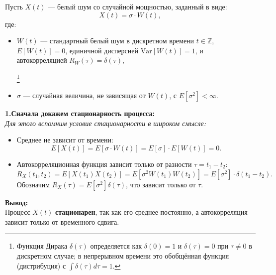 {

Пусть \( X(t) \) — белый шум со случайной мощностью, заданный в виде:
\[
X(t) = \sigma \cdot W(t),
\]
где:
\begin{itemize}
\item \( W(t) \) — стандартный белый шум в дискретном времени \(t
  \in \mathbb{Z}\), \(
  E[W(t)] = 0 \), единичной дисперсией \( \text{Var}[W(t)] = 1 \),
  и автокорреляцией \( R_W(\tau) = \delta(\tau) \),

  \footnote{Функция Дирака $\delta(\tau)$ определяется как
    $\delta(0)=1$ и $\delta(\tau)=0$ при $\tau \neq 0$ в дискретном
    случае; в непрерывном времени это обобщённая функция (дистрибуция)
  с $\int \delta(\tau) d\tau = 1$.}

\item \( \sigma \) — случайная величина, не зависящая от \( W(t)
  \), с \( E[\sigma^2] < \infty \).
\end{itemize}

\textbf{1.Сначала докажем стационарность процесса:}\\
\textit{Для этого вспомним условие стационарности в широком смысле:}

\begin{itemize}
\item Среднее не зависит от времени:
  \[
    E[X(t)] = E[\sigma \cdot W(t)] = E[\sigma] \cdot E[W(t)] = 0.
  \]

\item Автокорреляционная функция зависит только от разности \( \tau
  = t_1 - t_2 \):
  \[
    R_X(t_1, t_2) = E[X(t_1)X(t_2)] = E[\sigma^2 W(t_1) W(t_2)] =
    E[\sigma^2] \cdot \delta(t_1 - t_2).
  \]
  Обозначим \( R_X(\tau) = E[\sigma^2] \delta(\tau) \), что зависит
  только от \( \tau \).
\end{itemize}

\textbf{Вывод:}\\
Процесс \( X(t) \) \textbf{стационарен}, так как его среднее
постоянно, а автокорреляция зависит только от временного сдвига.\\

}
